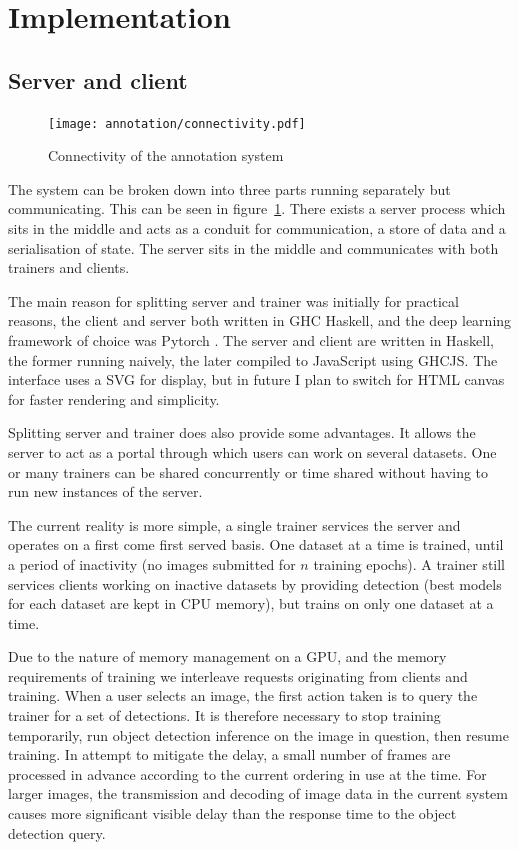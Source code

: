  

\section {Implementation}

\subsection{Server and client}

\begin{figure}[h!]
  \centering
  \texttt{[image: annotation/connectivity.pdf]}
  \caption{Connectivity of the annotation system}  
  \label{fig:connectivity}
\end{figure}

The system can be broken down into three parts running separately but communicating. This can be seen in figure~\ref{fig:connectivity}. There exists a server process which sits in the middle and acts as a conduit for communication, a store of data and a serialisation of state. The server sits in the middle and communicates with both trainers and clients.

The main reason for splitting server and trainer was initially for practical reasons, the client and server both written in \gls{GHC} Haskell, and the deep learning framework of choice was Pytorch \cite{Paszke2017}. The server and client are written in Haskell, the former running naively, the later compiled to JavaScript using \gls{GHCJS}. The interface uses a \gls{SVG} for display, but in future I plan to switch for \gls{HTML} canvas for faster rendering and simplicity.

Splitting server and trainer does also provide some advantages. It allows the server to act as a portal through which users can work on several datasets. One or many trainers can be shared concurrently or time shared without having to run new instances of the server. 

The current reality is more simple, a single trainer services the server and operates on a first come first served basis. One dataset at a time is trained, until a period of inactivity (no images submitted for $ n $ training epochs). A trainer still services clients working on inactive datasets by providing detection (best models for each dataset are kept in \gls{CPU} memory), but trains on only one dataset at a time. 

Due to the nature of memory management on a \gls{GPU}, and the memory requirements of training we interleave requests originating from clients and training. When a user selects an image, the first action taken is to query the trainer for a set of detections. It is therefore necessary to stop training temporarily, run object detection inference on the image in question, then resume training. In attempt to mitigate the delay, a small number of frames are processed in advance according to the current ordering in use at the time. For larger images, the transmission and decoding of image data in the current system causes more significant visible delay than the response time to the object detection query.

